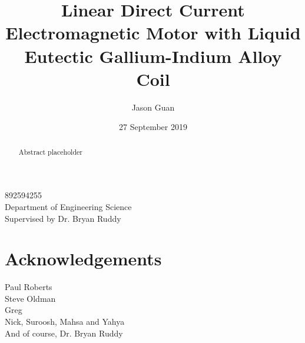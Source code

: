 \documentclass[a4paper,12pt]{article}
\title{Linear Direct Current Electromagnetic Motor with Liquid Eutectic Gallium-Indium Alloy Coil}
\author{Jason Guan}
\date{27 September 2019}
\begin{document}
\maketitle
\begin{center}
    892594255\\
    Department of Engineering Science\\
    Supervised by Dr. Bryan Ruddy
\end{center}

\newpage

\begin{abstract}
Abstract placeholder
\end{abstract}

\newpage

\section*{Acknowledgements}
Paul Roberts \\
Steve Oldman \\
Greg \\
Nick, Suroosh, Mahsa and Yahya \\
And of course, Dr. Bryan Ruddy \\

\newpage

\tableofcontents

\newpage
\end{document}
